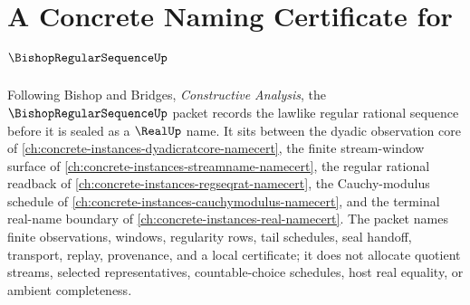 \chapter{A Concrete Naming Certificate for $\BishopRegularSequenceUp$}
\label{ch:concrete-instances-bishop-regular-sequence-namecert}

Following Bishop and Bridges, \emph{Constructive Analysis}, the $\BishopRegularSequenceUp$ packet records the lawlike regular rational sequence before it is sealed as a $\RealUp$ name. It sits between the dyadic observation core of \autoref{ch:concrete-instances-dyadicratcore-namecert}, the finite stream-window surface of \autoref{ch:concrete-instances-streamname-namecert}, the regular rational readback of \autoref{ch:concrete-instances-regseqrat-namecert}, the Cauchy-modulus schedule of \autoref{ch:concrete-instances-cauchymodulus-namecert}, and the terminal real-name boundary of \autoref{ch:concrete-instances-real-namecert}. The packet names finite observations, windows, regularity rows, tail schedules, seal handoff, transport, replay, provenance, and a local certificate; it does not allocate quotient streams, selected representatives, countable-choice schedules, host real equality, or ambient completeness.

